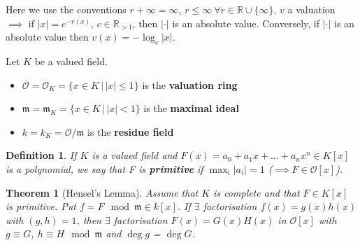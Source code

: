 \documentclass[a4paper]{article}
\newtheorem*{definition}{Definition}
\newtheorem{theorem}[lemma]{Theorem}
\newcommand*\abs[1]{\left|#1\right|}
\begin{document}
Here we use the conventions $r+\infty = \infty$, $r \leq \infty\ \forall r \in \mathbb{R} \cup \{\infty\}$. $v$ a valuation $\implies \text{ if } \abs{x} = c^{-v(x)},\, c \in \mathbb{R}_{>1}$, then $\abs{\cdot}$ is an absolute value. Conversely, if $\abs{\cdot}$ is an absolute value then $v(x)=-\log_c\abs{x}$.

Let $K$ be a valued field.
\begin{itemize}
	\item $\mathcal{O} = \mathcal{O}_K = \{x \in K \,|\, \abs{x} \leq 1\}$ is the \textbf{valuation ring}
	\item $\mathfrak{m} = \mathfrak{m}_K = \{x \in K \,|\, \abs{x} < 1\}$ is the \textbf{maximal ideal}
	\item $k = k_K = \mathcal{O}/\mathfrak{m}$ is the \textbf{residue field}
\end{itemize}

\begin{definition}
	If $K$ is a valued field and $F(x)=a_0 + a_1 x + \dots + a_n x^n \in K[x]$ is a polynomial, we say that F is \textbf{primitive} if $\max_i \abs{a_i} = 1$ ($\implies F \in \mathcal{O}[x]$).
\end{definition}

\begin{theorem}[Hensel's Lemma]
	Assume that $K$ is complete and that $F \in K[x]$ is primitive. Put $f = F \mod \mathfrak{m} \in k[x]$. If $\exists$ factorisation $f(x)=g(x)h(x)$ with $(g,h)=1$, then $\exists$ factorisation $F(x)=G(x)H(x)$ in $\mathcal{O}[x]$ with $g \equiv G$, $h \equiv H \mod \mathfrak{m}$ and $\deg g$ = $\deg G$.
\end{theorem}
\end{document}
